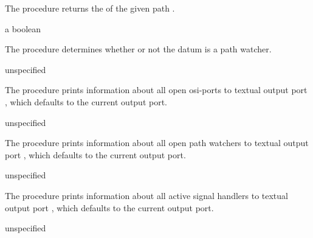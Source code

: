 The  procedure returns the  of the
given path .

\begin{procedure}
\end{procedure}
\returns{} a boolean

The  procedure determines whether or not the datum
 is a path watcher.

\begin{procedure}
\end{procedure}
\returns{} unspecified

The  procedure prints information about all open
osi-ports to textual output port , which defaults to the
current output port.

\begin{procedure}
\end{procedure}
\returns{} unspecified

The  procedure prints information about all
open path watchers to textual output port
, which defaults to the current output port.

\begin{procedure}
\end{procedure}
\returns{} unspecified

The  procedure prints information about all
active signal handlers to textual output port
, which defaults to the current output port.

\begin{procedure}
\end{procedure}
\returns{} unspecified

